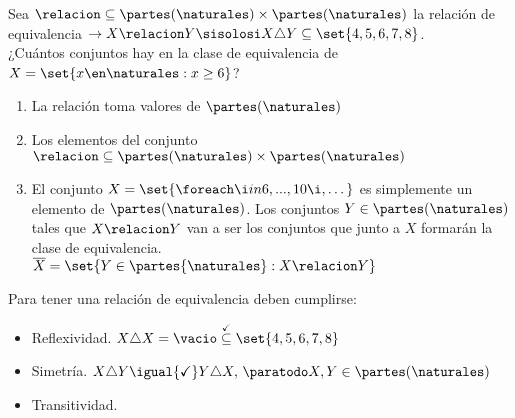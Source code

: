 \ejExtra
Sea $\relacion \subseteq \partes(\naturales) \times \partes(\naturales)$ la relación de equivalencia
$\to X \relacion Y \sisolosi X \triangle Y \subseteq \set{4,5,6,7,8}$.\\
¿Cuántos conjuntos hay en la clase de equivalencia de $X = \set{x \en \naturales : x \geq 6}$?

\separadorCorto

\begin{enumerate}
	\item La relación toma valores de $\partes(\naturales)$

	\item Los elementos del conjunto $\relacion \subseteq \partes(\naturales) \times \partes(\naturales)$

	\item El conjunto $X = \set{\foreach \i in {6,...,10}{\i, }\dots}$ es simplemente un elemento de $\partes(\naturales)$.
	      Los conjuntos $Y \in \partes(\naturales)$ tales que $X \relacion Y$ van a ser los conjuntos que junto a $X$ formarán la
	      clase de equivalencia.\\
	      $ \overline{X} = \set{Y \in \partes{\naturales} : X \relacion Y}$
\end{enumerate}

Para tener una relación de equivalencia deben cumplirse:
\begin{itemize}
	\item Reflexividad. $X \triangle X = \vacio \stackrel{\checkmark}\subseteq \set{4,5,6,7,8}$
	\item Simetría. $X \triangle Y \igual{\checkmark} Y \triangle X,\, \paratodo X,Y \in \partes(\naturales)$
	\item Transitividad.
\end{itemize}

